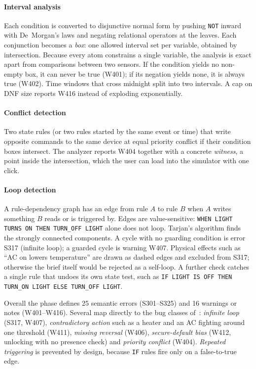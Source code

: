 \documentclass[conference]{IEEEtran}
\newcommand{\code}[1]{\texttt{#1}}
\begin{document}
\paragraph{Interval analysis}
Each condition is converted to disjunctive normal form by pushing \code{NOT} inward with De~Morgan's laws and negating relational operators at the leaves. Each conjunction becomes a \emph{box}: one allowed interval set per variable, obtained by intersection. Because every atom constrains a single variable, the analysis is exact apart from comparisons between two sensors. If the condition yields no non-empty box, it can never be true (W401); if its negation yields none, it is always true (W402). Time windows that cross midnight split into two intervals. A cap on DNF size reports W416 instead of exploding exponentially.

\paragraph{Conflict detection}
Two state rules (or two rules started by the same event or time) that write opposite commands to the same device at equal priority conflict if their condition boxes intersect. The analyzer reports W404 together with a concrete \emph{witness}, a point inside the intersection, which the user can load into the simulator with one click.

\paragraph{Loop detection}
A rule-dependency graph has an edge from rule $A$ to rule $B$ when $A$ writes something $B$ reads or is triggered by. Edges are value-sensitive: \code{WHEN LIGHT TURNS ON THEN TURN\_OFF LIGHT} alone does not loop. Tarjan's algorithm finds the strongly connected components. A cycle with no guarding condition is error S317 (infinite loop); a guarded cycle is warning W407. Physical effects such as ``AC on lowers temperature'' are drawn as dashed edges and excluded from S317; otherwise the brief itself would be rejected as a self-loop. A further check catches a single rule that undoes its own state test, such as \code{IF LIGHT IS OFF THEN TURN\_ON LIGHT ELSE TURN\_OFF LIGHT}.

Overall the phase defines 25 semantic errors (S301--S325) and 16 warnings or notes (W401--W416). Several map directly to the bug classes of~\cite{brackenbury2019}: \emph{infinite loop} (S317, W407), \emph{contradictory action} such as a heater and an AC fighting around one threshold (W411), \emph{missing reversal} (W406), \emph{secure-default bias} (W412, unlocking with no presence check) and \emph{priority conflict} (W404). \emph{Repeated triggering} is prevented by design, because \code{IF} rules fire only on a false-to-true edge.
\end{document}
